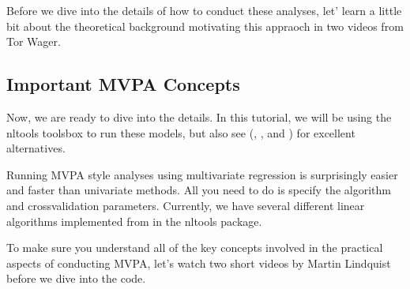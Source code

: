 \documentclass[letterpaper,10pt,english]{sphinxmanual}
\begin{document}
Before we dive into the details of how to conduct these analyses, let’ learn a little bit about the theoretical background motivating this appraoch in two videos from Tor Wager.

\begin{sphinxVerbatim}[commandchars=\\\{\}]
   

\end{sphinxVerbatim}

\noindent{}

\begin{sphinxVerbatim}[commandchars=\\\{\}]
\end{sphinxVerbatim}

\noindent{}


\subsection{Important MVPA Concepts}
\label{\detokenize{content/Multivariate_Prediction:important-mvpa-concepts}}
Now, we are ready to dive into the details. In this tutorial, we will be using the nltools toolsbox to run these models, but also see (, , and ) for excellent alternatives.

Running MVPA style analyses using multivariate regression is surprisingly easier and faster than univariate methods. All you need to do is specify the algorithm and cross\sphinxhyphen{}validation parameters. Currently, we have several different linear algorithms implemented from  in the nltools package.

To make sure you understand all of the key concepts involved in the practical aspects of conducting MVPA, let’s watch two short videos by Martin Lindquist before we dive into the code.

\begin{sphinxVerbatim}[commandchars=\\\{\}]
\end{sphinxVerbatim}
\end{document}
